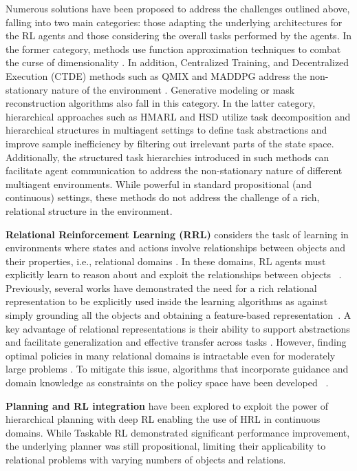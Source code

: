 Numerous solutions have been proposed to address the challenges outlined above, falling into two main categories: those adapting the underlying architectures for the RL agents and those considering the overall tasks performed by the agents. In the former category, methods use function approximation techniques to combat the curse of dimensionality \citep{dreduction}. In addition, Centralized Training, and Decentralized Execution (CTDE) methods such as QMIX and MADDPG address the non-stationary nature of the environment \citep{Qmix, maddpg}. Generative modeling or mask reconstruction algorithms \citep{sampleGene, sampleefficientMARL} also fall in this category. In the latter category, hierarchical approaches such as HMARL \citep{hmarl} and HSD \citep{hsd} utilize task decomposition and hierarchical structures in multiagent settings to define task abstractions and improve sample inefficiency by filtering out irrelevant parts of the state space. Additionally, the structured task hierarchies introduced in such methods can facilitate agent communication to address the non-stationary nature of different multiagent environments. While powerful in standard propositional (and continuous) settings, these methods do not address the challenge of a rich, relational structure in the environment.

\textbf{Relational Reinforcement Learning (RRL)} considers the task of learning in environments where states and actions involve relationships between objects and their properties, i.e., relational domains \citep{rrl}. In these domains, RL agents must explicitly learn to reason about and exploit the relationships between objects ~\citep{tadepalli2004relational}. 
Previously, several works have demonstrated the need for a rich relational representation to be explicitly used inside the learning algorithms as against simply grounding all the objects and obtaining a feature-based representation~\cite{StaRAIBook,liftedbook}. A key advantage of relational representations is their ability to support abstractions and facilitate generalization and effective transfer across tasks \citep{SRLBook, starai_nesy, rrl_survey_ottolo}.  However, finding optimal policies in many relational domains is intractable even for moderately large problems \citep{tadepalli2004relational}. To mitigate this issue, algorithms that incorporate guidance and domain knowledge as constraints on the policy space have been developed ~\citep{rrl_guidance}. 

\textbf{Planning and RL integration} have been explored to exploit the power of hierarchical planning with deep RL enabling the use of HRL in continuous domains. While Taskable RL \citep{TaskableRL} demonstrated significant performance improvement, the underlying planner was still propositional, limiting their applicability to relational problems with varying numbers of objects and relations.

